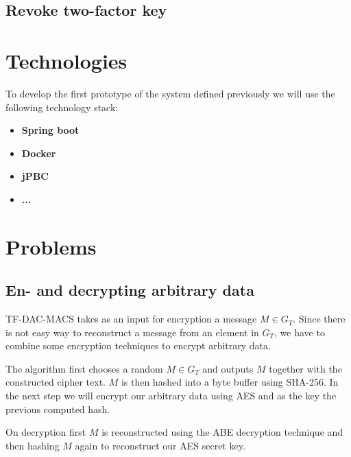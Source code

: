 \subsection{Revoke two-factor key}



\section{Technologies}
To develop the first prototype of the system defined previously we will use the following technology stack:

\begin{itemize}
  \item \textbf{Spring boot}
  \item \textbf{Docker}
  \item \textbf{jPBC} \cite{ISCC:DecIov11}
  \item \textbf{...}
\end{itemize}

\section{Problems}

\subsection{En- and decrypting arbitrary data}
TF-DAC-MACS takes as an input for encryption a message $M \in G_T$. Since there is not easy way to reconstruct a message from an element in $G_T$, we have to combine some encryption techniques to encrypt arbitrary data. 

The algorithm first chooses a random $M \in G_T$ and outputs $M$ together with the constructed cipher text. $M$ is then hashed into a byte buffer using \ac{SHA}-256. In the next step we will encrypt our arbitrary data using \ac{AES} and as the key the previous computed hash. 

On decryption first $M$ is reconstructed using the ABE decryption technique and then hashing $M$ again to reconstruct our AES secret key. 